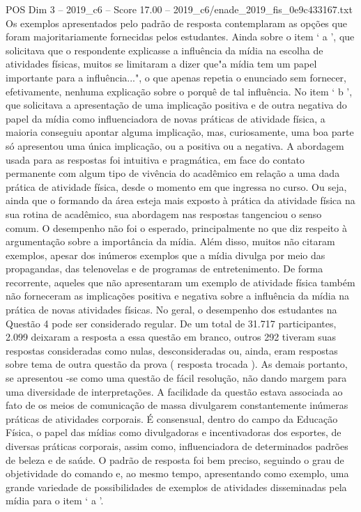 \begin{textsample}{POS Dim 3 – 2019\_c6 – Score 17.00 – 2019\_c6/enade\_2019\_fis\_0e9c433167.txt}
Os exemplos apresentados pelo padrão de resposta contemplaram as opções que foram majoritariamente fornecidas pelos estudantes.
Ainda sobre o item ‘ a ’, que solicitava que o respondente explicasse a influência da mídia na escolha de atividades físicas, muitos se limitaram a dizer que"a mídia tem um papel importante para a influência...", o que apenas repetia o enunciado sem fornecer, efetivamente, nenhuma explicação sobre o porquê de tal influência.
No item ‘ b ’, que solicitava a apresentação de uma implicação positiva e de outra negativa do papel da mídia como influenciadora de novas práticas de atividade física, a maioria conseguiu apontar alguma implicação, mas, curiosamente, uma boa parte só apresentou uma única implicação, ou a positiva ou a negativa.
A abordagem usada para as respostas foi intuitiva e pragmática, em face do contato permanente com algum tipo de vivência do acadêmico em relação a uma dada prática de atividade física, desde o momento em que ingressa no curso.
Ou seja, ainda que o formando da área esteja mais exposto à prática da atividade física na sua rotina de acadêmico, sua abordagem nas respostas tangenciou o senso comum.
O desempenho não foi o esperado, principalmente no que diz respeito à argumentação sobre a importância da mídia.
Além disso, muitos não citaram exemplos, apesar dos inúmeros exemplos que a mídia divulga por meio das propagandas, das telenovelas e de programas de entretenimento.
De forma recorrente, aqueles que não apresentaram um exemplo de atividade física também não forneceram as implicações positiva e negativa sobre a influência da mídia na prática de novas atividades físicas.
No geral, o desempenho dos estudantes na Questão 4 pode ser considerado regular.
De um total de 31.717 participantes, 2.099 deixaram a resposta a essa questão em branco, outros 292 tiveram suas respostas consideradas como nulas, desconsideradas ou, ainda, eram respostas sobre tema de outra questão da prova ( resposta trocada ).
As demais portanto, se apresentou -se como uma questão de fácil resolução, não dando margem para uma diversidade de interpretações.
A facilidade da questão estava associada ao fato de os meios de comunicação de massa divulgarem constantemente inúmeras práticas de atividades corporais.
É consensual, dentro do campo da Educação Física, o papel das mídias como divulgadoras e incentivadoras dos esportes, de diversas práticas corporais, assim como, influenciadora de determinados padrões de beleza e de saúde.
O padrão de resposta foi bem preciso, seguindo o grau de objetividade do comando e, ao mesmo tempo, apresentando como exemplo, uma grande variedade de possibilidades de exemplos de atividades disseminadas pela mídia para o item ‘ a ’.

\end{textsample}
